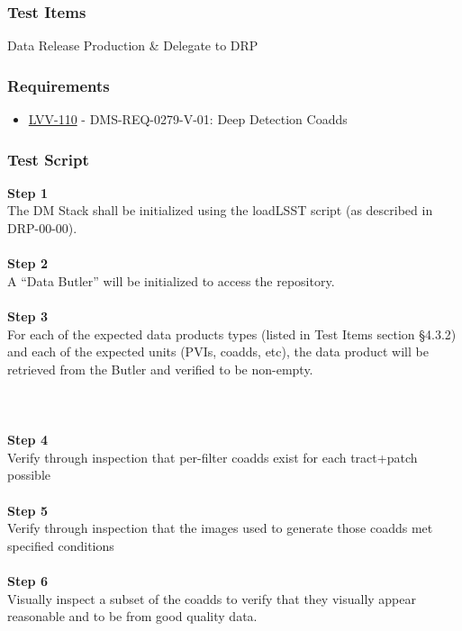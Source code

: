 \hypertarget{test-items-162}{%
\subsubsection{Test Items}\label{test-items-162}}

Data Release Production \& Delegate to DRP

\hypertarget{requirements-163}{%
\subsubsection{Requirements}\label{requirements-163}}

\begin{itemize}
\tightlist
\item
  \href{https://jira.lsstcorp.org/browse/LVV-110}{LVV-110} -
  DMS-REQ-0279-V-01: Deep Detection Coadds
\end{itemize}

\hypertarget{test-script-163}{%
\subsubsection{Test Script}\label{test-script-163}}

\textbf{Step 1}\\
The DM Stack shall be initialized using the loadLSST script (as
described in DRP-00-00).\\
~\\
\textbf{Step 2}\\
A ``Data Butler'' will be initialized to access the repository.\\
~\\
\textbf{Step 3}\\
For each of the expected data products types (listed in Test Items
section §4.3.2) and each of the expected units (PVIs, coadds, etc), the
data product will be retrieved from the Butler and verified to be
non-empty.\\
~\\
~\\
~\\
\textbf{Step 4}\\
Verify through inspection that per-filter coadds exist for each
tract+patch possible\\
~\\
\textbf{Step 5}\\
Verify through inspection that the images used to generate those coadds
met specified conditions\\
~\\
\textbf{Step 6}\\
Visually inspect a subset of the coadds to verify that they visually
appear reasonable and to be from good quality data.\\
~\\

